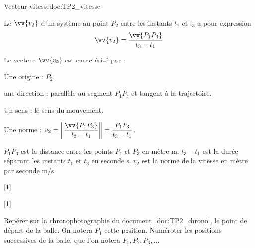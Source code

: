 \begin{doc}{Vecteur vitesse}{doc:TP2_vitesse}
  \begin{importants}
    Le  $\vv{v_2}$ d'un système au point $P_2$ entre les instants $t_1$ et $t_3$ a pour expression
    \begin{equation*}
      \vv{v_2} = \frac{\vv{P_1 P_3}}{t_3 - t_1}
    \end{equation*}
  \end{importants}
  
  Le vecteur $\vv{v_2}$ est caractérisé par :
  \vspace*{-8pt}
  \begin{listePoints}[2]
    \item Une origine : $P_2$.
    \item une direction : parallèle au segment $P_1 P_3$ et tangent à la trajectoire.
    \item Un sens : le sens du mouvement.
    \item Une norme : $v_2 
    = \displaystyle \norm{\frac{\vv{P_1 P_3}}{t_3 - t_1}}
    = \displaystyle \frac{P_1 P_3}{t_3 - t_1}$.
  \end{listePoints}
  
  $P_1 P_3$ est la distance entre les points $P_1$ et $P_3$ en mètre \unit{\m}.
  $t_3 - t_1$ est la durée séparant les instants $t_1$ et $t_3$ en seconde \unit{\s}.
  $v_2$ est la norme de la vitesse en mètre par seconde \unit{\m/\s}.
\end{doc}


\vspace*{-4pt}

%
[1]

%
[1]



%
\mesure
Repérer sur la chronophotographie du document~\ref{doc:TP2_chrono}, le point de départ de la balle.
On notera $P_1$ cette position.
Numéroter les positions successives de la balle, que l'on notera $P_1, P_2, P_3, \ldots$


